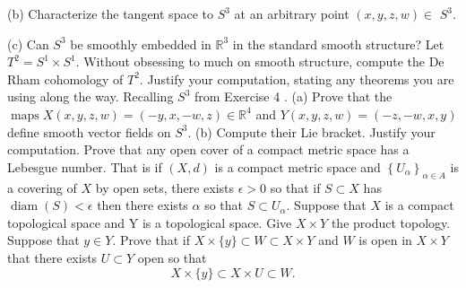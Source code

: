 \documentclass[14pt]{extarticle}
\begin{document}
(b) Characterize the tangent space to $S^{3}$ at an arbitrary point $(x, y, z, w) \in$ $S^{3}$.

(c) Can $S^{3}$ be smoothly embedded in $\mathbb{R}^{3}$ in the standard smooth structure?
\newpage
Let $T^{2}=S^{1} \times S^{1}$. Without obsessing to much on smooth structure, compute the De Rham cohomology of $T^{2}$. Justify your computation, stating any theorems you are using along the way.
\newpage
Recalling $S^{3}$ from Exercise 4 .
(a) Prove that the $\operatorname{maps} X(x, y, z, w)=(-y, x,-w, z) \in \mathbb{R}^{4}$ and $Y(x, y, z, w)=(-z,-w, x, y)$ define smooth vector fields on $S^{3}$.
(b) Compute their Lie bracket. Justify your computation.
\newpage
Prove that any open cover of a compact metric space has a Lebesgue number. That is if $(X, d)$ is a compact metric space and $\left\{U_{\alpha}\right\}_{\alpha \in A}$ is a covering of $X$ by open sets, there exists $\epsilon>0$ so that if $S \subset X$ has $\operatorname{diam}(S)<\epsilon$ then there exists $\alpha$ so that $S \subset U_{\alpha}$.
\newpage
Suppose that $X$ is a compact topological space and $\mathrm{Y}$ is a topological space. Give $X \times Y$ the product topology. Suppose that $y \in Y$. Prove that if $X \times\{y\} \subset W \subset X \times Y$ and $W$ is open in $X \times Y$ that there exists $U \subset Y$ open so that
$$
X \times\{y\} \subset X \times U \subset W .
$$
\newpage
\end{document}
